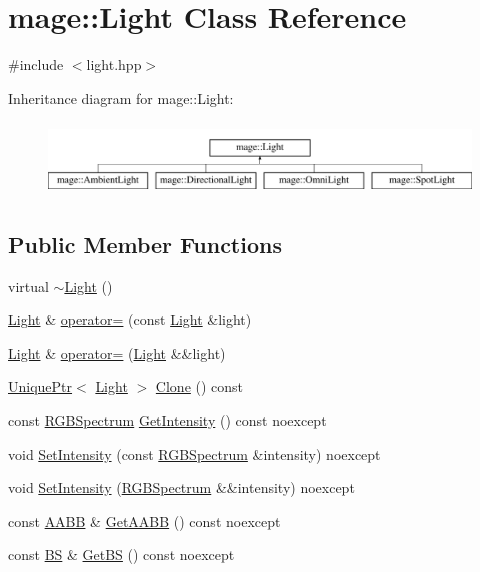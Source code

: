 \hypertarget{classmage_1_1_light}{}\section{mage\+:\+:Light Class Reference}
\label{classmage_1_1_light}


{\ttfamily \#include $<$light.\+hpp$>$}

Inheritance diagram for mage\+:\+:Light\+:\begin{figure}[H]
\begin{center}
\leavevmode
\includegraphics[height=1.944445cm]{classmage_1_1_light}
\end{center}
\end{figure}
\subsection*{Public Member Functions}
\begin{DoxyCompactItemize}
\item 
virtual \hyperlink{classmage_1_1_light_af877bc473dede83689a4bda8a36d4d36}{$\sim$\+Light} ()
\item 
\hyperlink{classmage_1_1_light}{Light} \& \hyperlink{classmage_1_1_light_ad1267c8d162e2cdead5e3a7d83cef3c1}{operator=} (const \hyperlink{classmage_1_1_light}{Light} \&light)
\item 
\hyperlink{classmage_1_1_light}{Light} \& \hyperlink{classmage_1_1_light_a5fd2edc3fcbcc1dbe7a2620b76cedd25}{operator=} (\hyperlink{classmage_1_1_light}{Light} \&\&light)
\item 
\hyperlink{namespacemage_a3316d7143a973e37adf1110f2e80ca31}{Unique\+Ptr}$<$ \hyperlink{classmage_1_1_light}{Light} $>$ \hyperlink{classmage_1_1_light_a4c87e4a361b20519c49b4a0397625a6a}{Clone} () const
\item 
const \hyperlink{structmage_1_1_r_g_b_spectrum}{R\+G\+B\+Spectrum} \hyperlink{classmage_1_1_light_ad4ffb4c5fa06812e7d523a69b177d55a}{Get\+Intensity} () const noexcept
\item 
void \hyperlink{classmage_1_1_light_ab7312aee7c5f7b4b564e27592e1b4223}{Set\+Intensity} (const \hyperlink{structmage_1_1_r_g_b_spectrum}{R\+G\+B\+Spectrum} \&intensity) noexcept
\item 
void \hyperlink{classmage_1_1_light_af96cc7c32afbfdc4d9b1a19b8ac0bf13}{Set\+Intensity} (\hyperlink{structmage_1_1_r_g_b_spectrum}{R\+G\+B\+Spectrum} \&\&intensity) noexcept
\item 
const \hyperlink{structmage_1_1_a_a_b_b}{A\+A\+BB} \& \hyperlink{classmage_1_1_light_a1ce1d4a97857b182e629e0e546beb280}{Get\+A\+A\+BB} () const noexcept
\item 
const \hyperlink{structmage_1_1_b_s}{BS} \& \hyperlink{classmage_1_1_light_ab2365a76f8f3a2ae2c97263ea556a993}{Get\+BS} () const noexcept
\end{DoxyCompactItemize}
